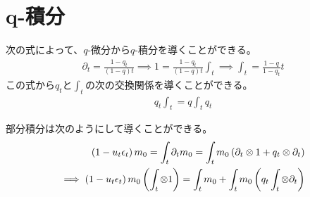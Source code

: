 \begingroup %
{\setlength\arraycolsep{2pt}
%
\section{q-積分}\label{s1:q-積分} %
	次の式によって、$q$-微分から$q$-積分を導くことができる。
	\begin{equation*}\begin{split}
		\partial_t = \frac{1-q_t}{(1-q)t}
		\implies 1 = \frac{1-q_t}{(1-q)t}\int_t
		\implies \int_t = \frac{1-q}{1-q_t}t
	\end{split}\end{equation*}
	この式から$q_t$と$\int_t$の次の交換関係を導くことができる。
	\begin{equation*}\begin{split}
		q_t\int_t = q\int_tq_t
	\end{split}\end{equation*}

	部分積分は次のようにして導くことができる。
	\begin{equation*}\begin{split}
		\mathinner{({1 - u_t\epsilon_t})}m_0 = \int_t\partial_tm_0
		= \int_tm_0\mathinner{({\partial_t\otimes1 + q_t\otimes\partial_t})} \\
		\implies \mathinner{({1 - u_t\epsilon_t})}m_0\mathinner{\left({\int_t\otimes1}\right)} 
		= \int_tm_0 + \int_tm_0\mathinner{\left({q_t\int_t\otimes\partial_t}\right)}
	\end{split}\end{equation*}
%
}\endgroup %

